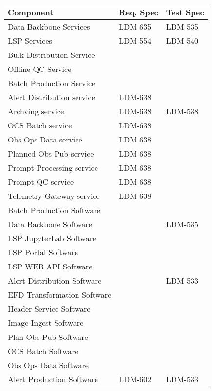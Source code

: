 {\small
\begin{longtable}[]{p{8cm}|p{2cm}|p{2cm}}\hline
{\bf Component} & {\bf Req. Spec} & {\bf Test Spec} \\ \hline
Data Backbone Services & \cellcolor{pastelyellow} LDM-635 & \cellcolor{pastelyellow} LDM-535 \\\hline
LSP Services & \cellcolor{pastelyellow} LDM-554 & \cellcolor{pastelyellow} LDM-540 \\\hline
Bulk Distribution Service & & \\\hline
Offline QC Service & & \\\hline
Batch Production Service & & \\\hline
Alert Distribution service & \cellcolor{pastelyellow} LDM-638 & \\\hline
Archving service & \cellcolor{pastelyellow} LDM-638 & \cellcolor{ballblue} LDM-538 \\\hline
OCS Batch service & \cellcolor{pastelyellow} LDM-638 & \\\hline
Obs Ops Data service & \cellcolor{pastelyellow} LDM-638 & \\\hline
Planned Obs Pub service & \cellcolor{pastelyellow} LDM-638 & \\\hline
Prompt Processing service & \cellcolor{pastelyellow} LDM-638 & \\\hline
Prompt QC service & \cellcolor{pastelyellow} LDM-638 & \\\hline
Telemetry Gateway service & \cellcolor{pastelyellow} LDM-638 & \\\hline
Batch Production Software & & \\\hline
Data Backbone Software & & \cellcolor{pastelyellow} LDM-535 \\\hline
LSP JupyterLab Software & & \\\hline
LSP Portal Software & & \\\hline
LSP WEB API Software & & \\\hline
Alert Distribution Software & & \cellcolor{ballblue} LDM-533 \\\hline
EFD Transformation Software & & \\\hline
Header Service Software & & \\\hline
Image Ingest Software & & \\\hline
Plan Obs Pub Software & & \\\hline
OCS Batch Software & & \\\hline
Obs Ops Data Software & & \\\hline
Alert Production Software & \cellcolor{ballblue} LDM-602 & \cellcolor{ballblue} LDM-533 \\\hline

\end{longtable}}
